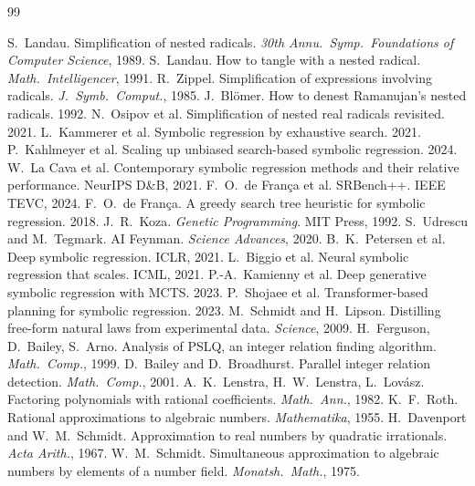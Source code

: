 \documentclass[11pt]{article}
\begin{document}

\begin{thebibliography}{99}

 S.~Landau. Simplification of nested radicals. \textit{30th Annu.\ Symp.\ Foundations of Computer Science}, 1989.
 S.~Landau. How to tangle with a nested radical. \textit{Math.\ Intelligencer}, 1991.
 R.~Zippel. Simplification of expressions involving radicals. \textit{J.\ Symb.\ Comput.}, 1985.
 J.~Bl{\"o}mer. How to denest Ramanujan's nested radicals. 1992.
 N.~Osipov et al. Simplification of nested real radicals revisited. 2021.
 L.~Kammerer et al. Symbolic regression by exhaustive search. 2021.
 P.~Kahlmeyer et al. Scaling up unbiased search-based symbolic regression. 2024.
 W.~La Cava et al. Contemporary symbolic regression methods and their relative performance. NeurIPS D\&B, 2021.
 F.~O.~de Fran\c{c}a et al. SRBench++. IEEE TEVC, 2024.
 F.~O.~de Fran\c{c}a. A greedy search tree heuristic for symbolic regression. 2018.
 J.~R.~Koza. \textit{Genetic Programming}. MIT Press, 1992.
 S.~Udrescu and M.~Tegmark. AI Feynman. \textit{Science Advances}, 2020.
 B.~K.~Petersen et al. Deep symbolic regression. ICLR, 2021.
 L.~Biggio et al. Neural symbolic regression that scales. ICML, 2021.
 P.-A.~Kamienny et al. Deep generative symbolic regression with MCTS. 2023.
 P.~Shojaee et al. Transformer-based planning for symbolic regression. 2023.
 M.~Schmidt and H.~Lipson. Distilling free-form natural laws from experimental data. \textit{Science}, 2009.
 H.~Ferguson, D.~Bailey, S.~Arno. Analysis of PSLQ, an integer relation finding algorithm. \textit{Math.\ Comp.}, 1999.
 D.~Bailey and D.~Broadhurst. Parallel integer relation detection. \textit{Math.\ Comp.}, 2001.
 A.~K.~Lenstra, H.~W.~Lenstra, L.~Lov\'asz. Factoring polynomials with rational coefficients. \textit{Math.\ Ann.}, 1982.
 K.~F.~Roth. Rational approximations to algebraic numbers. \textit{Mathematika}, 1955.
 H.~Davenport and W.~M.~Schmidt. Approximation to real numbers by quadratic irrationals. \textit{Acta Arith.}, 1967.
 W.~M.~Schmidt. Simultaneous approximation to algebraic numbers by elements of a number field. \textit{Monatsh.\ Math.}, 1975.

\end{thebibliography}
\end{document}
